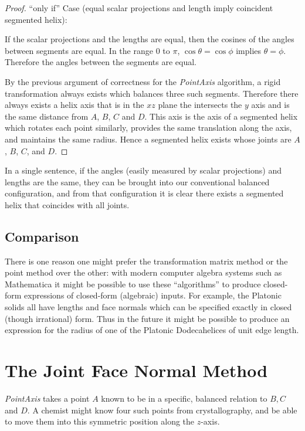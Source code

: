 \documentclass[11pt]{article}
\begin{document}
{\begin{proof}
  ``only if'' Case (equal scalar projections and length imply coincident segmented helix):

  If the scalar projections and the lengths are equal, then the cosines of the angles between segments are equal.
  In the range $0$ to $\pi$,
  $\cos{\theta} = \cos{\phi}$ implies $\theta = \phi$. Therefore the angles between the segments are equal.

  By the previous argument of correctness for the {\em PointAxis} algorithm, a rigid transformation always exists
  which balances three such segments. Therefore there always exists a helix axis that
  is in the $xz$ plane the intersects the $y$ axis and is the same distance from $A$, $B$, $C$ and $D$.
  This axis is the axis of a segmented helix which rotates each point similarly, provides the same translation along the axis,
  and maintains the same radius. Hence a segmented helix exists whose joints are $A$, $B$, $C$, and $D$.
\end{proof}

In a single sentence, if the angles (easily measured by scalar projections) and lengths are the same,
they can be brought into our conventional balanced configuration,
and from that configuration it is clear there exists a segmented helix that coincides with all joints.

\subsection{Comparison}

There is one reason one might prefer the transformation matrix method or the point method over the other: with modern
computer algebra systems such as Mathematica\cite{Mathematica} it might be possible to use these ``algorithms'' to produce closed-form
expressions of closed-form (algebraic) inputs. For example, the Platonic solids all have lengths and face normals which
can be specified exactly in closed (though irrational) form.
Thus in the future it might be possible to produce an expression for the
radius of one of the Platonic Dodecahelices of unit edge length.


\section{The Joint Face Normal Method}
\label{sec:facenormal}

{\em PointAxis} takes a point $A$ known to be in a specific, balanced relation
to $B, C$ and $D$. A chemist might know four such points from crystallography,
and be able to move them into this symmetric position along the $z$-axis.

}
\end{document}
